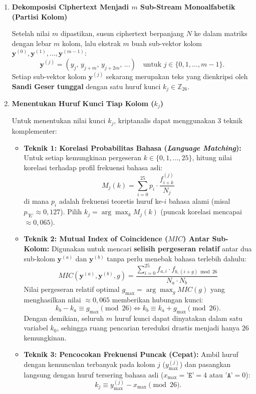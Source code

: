\documentclass[11pt,a4paper]{article}
\begin{document}
\begin{enumerate}[label=\textbf{Tahap \arabic* :}, leftmargin=*]
    \item \textbf{Dekomposisi Ciphertext Menjadi $m$ Sub-Stream Monoalfabetik (Partisi Kolom)}
    
    Setelah nilai $m$ dipastikan, susun ciphertext berpanjang $N$ ke dalam matriks dengan lebar $m$ kolom, lalu ekstrak $m$ buah sub-vektor kolom $\mathbf{y}^{(0)}, \mathbf{y}^{(1)}, \dots, \mathbf{y}^{(m-1)}$:
    \[
    \mathbf{y}^{(j)} = (y_j, \, y_{j+m}, \, y_{j+2m}, \, \dots) \quad \text{untuk } j \in \{0, 1, \dots, m-1\}.
    \]
    Setiap sub-vektor kolom $\mathbf{y}^{(j)}$ sekarang merupakan teks yang dienkripsi oleh \textbf{Sandi Geser tunggal} dengan satu huruf kunci $k_j \in \mathbb{Z}_{26}$.

    \item \textbf{Menentukan Huruf Kunci Tiap Kolom ($k_j$)}
    
    Untuk menentukan nilai kunci $k_j$, kriptanalis dapat menggunakan 3 teknik komplementer:
    \begin{itemize}[leftmargin=*]
        \item \textbf{Teknik 1: Korelasi Probabilitas Bahasa (\textit{Language Matching}):}
        Untuk setiap kemungkinan pergeseran $k \in \{0, 1, \dots, 25\}$, hitung nilai korelasi terhadap profil frekuensi bahasa asli:
        \[
        M_j(k) = \sum_{i=0}^{25} p_i \cdot \frac{f_{i+k}^{(j)}}{N_j}
        \]
        di mana $p_i$ adalah frekuensi teoretis huruf ke-$i$ bahasa alami (misal $p_{\text{'E'}} \approx 0{,}127$). Pilih $k_j = \arg\max_{k} M_j(k)$ (puncak korelasi mencapai $\approx 0{,}065$).
        
        \item \textbf{Teknik 2: Mutual Index of Coincidence ($MIC$) Antar Sub-Kolom:}
        Digunakan untuk mencari \textbf{selisih pergeseran relatif} antar dua sub-kolom $\mathbf{y}^{(a)}$ dan $\mathbf{y}^{(b)}$ tanpa perlu menebak bahasa terlebih dahulu:
        \[
        MIC(\mathbf{y}^{(a)}, \mathbf{y}^{(b)}, g) = \frac{\sum_{i=0}^{25} f_{a, i} \cdot f_{b, (i+g) \bmod 26}}{N_a \cdot N_b}
        \]
        Nilai pergeseran relatif optimal $g_{\max} = \arg\max_g MIC(g)$ yang menghasilkan nilai $\approx 0{,}065$ memberikan hubungan kunci:
        \[
        k_b - k_a \equiv g_{\max} \pmod{26} \iff k_b \equiv k_a + g_{\max} \pmod{26}.
        \]
        Dengan demikian, seluruh $m$ huruf kunci dapat dinyatakan dalam satu variabel $k_0$, sehingga ruang pencarian tereduksi drastis menjadi hanya $26$ kemungkinan.
        
        \item \textbf{Teknik 3: Pencocokan Frekuensi Puncak (Cepat):}
        Ambil huruf dengan kemunculan terbanyak pada kolom $j$ ($y_{\max}^{(j)}$) dan pasangkan langsung dengan huruf tersering bahasa asli ($x_{\max} = \texttt{'E'} = 4$ atau $\texttt{'A'} = 0$):
        \[
        k_j \equiv y_{\max}^{(j)} - x_{\max} \pmod{26}.
        \]
    \end{itemize}


\end{enumerate}
\end{document}

